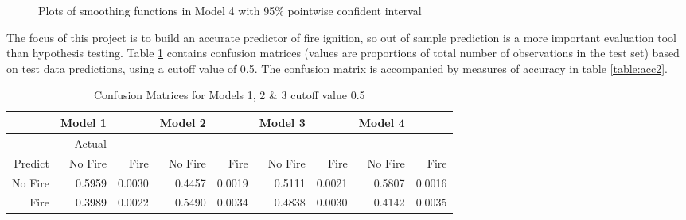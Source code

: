 \documentclass[11pt,a4paper]{article}
\begin{document}
\begin{figure}[h]
\null\vfill\noindent
\hfill
\vfill
\hfill
\vfill
\hfill
\vfill
\null
	\caption{Plots of smoothing functions in Model 4 with 95\% pointwise confident interval} 
	\label{fig:gam_pl} 
\end{figure}

The focus of this project is to build an accurate predictor of fire ignition, so out of sample prediction is a more important evaluation tool than hypothesis testing. Table \ref{table:cm2} contains confusion matrices (values are proportions of total number of observations in the test set) based on test data predictions, using a cutoff value of 0.5. The confusion matrix is accompanied by measures of accuracy in table \ref{table:acc2}. 

\begin{table}[ht]
	\centering
	\begin{tabular}{r|rr|rr|rr|rr}
		\hline
		& Model 1 &  & Model 2 &  & Model 3 &  & Model 4 & \\ 
		\hline
		& Actual   &  &  &  &  & & & \\ 
		Predict & No Fire & Fire & No Fire & Fire & No Fire & Fire & No Fire & Fire\\ 
		\hline
No Fire & 0.5959 & 0.0030 & 0.4457 & 0.0019 & 0.5111 & 0.0021 & 0.5807 & 0.0016 \\ 
Fire & 0.3989 & 0.0022 & 0.5490 & 0.0034 & 0.4838 & 0.0030 & 0.4142 & 0.0035 \\ 
		\hline
	\end{tabular}
	\caption{Confusion Matrices for Models 1, 2 \& 3 cutoff value 0.5}
	\label{table:cm2}
\end{table}
\end{document}
